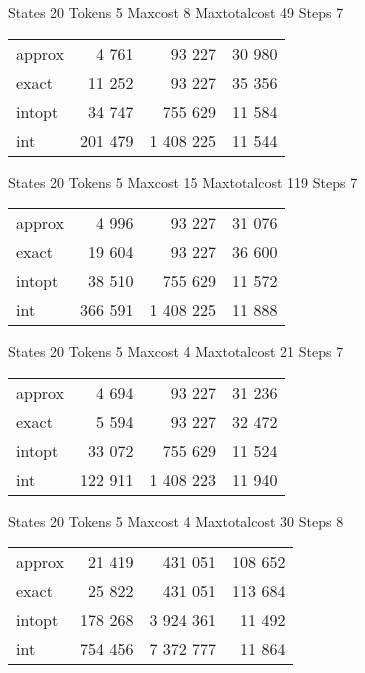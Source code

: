 \documentclass[a4paper,11pt]{article}
\begin{document}
\begin{table}
States 20 Tokens 5 Maxcost 8 Maxtotalcost 49 Steps 7 \\
\begin{tabular}{l r r r}
approx & 4 761 & 93 227 & 30 980 \\
exact & 11 252 & 93 227 & 35 356 \\
intopt & 34 747 & 755 629 & 11 584 \\
int & 201 479 & 1 408 225 & 11 544 \\
\end{tabular}
\end{table}

\begin{table}
States 20 Tokens 5 Maxcost 15 Maxtotalcost 119 Steps 7 \\
\begin{tabular}{l r r r}
approx & 4 996 & 93 227 & 31 076 \\
exact & 19 604 & 93 227 & 36 600 \\
intopt & 38 510 & 755 629 & 11 572 \\
int & 366 591 & 1 408 225 & 11 888 \\
\end{tabular}
\end{table}

\begin{table}
States 20 Tokens 5 Maxcost 4 Maxtotalcost 21 Steps 7 \\
\begin{tabular}{l r r r}
approx & 4 694 & 93 227 & 31 236 \\
exact & 5 594 & 93 227 & 32 472 \\
intopt & 33 072 & 755 629 & 11 524 \\
int & 122 911 & 1 408 223 & 11 940 \\
\end{tabular}
\end{table}

\begin{table}
States 20 Tokens 5 Maxcost 4 Maxtotalcost 30 Steps 8 \\
\begin{tabular}{l r r r}
approx & 21 419 & 431 051 & 108 652 \\
exact & 25 822 & 431 051 & 113 684 \\
intopt & 178 268 & 3 924 361 & 11 492 \\
int & 754 456 & 7 372 777 & 11 864 \\
\end{tabular}
\end{table}
\end{document}
